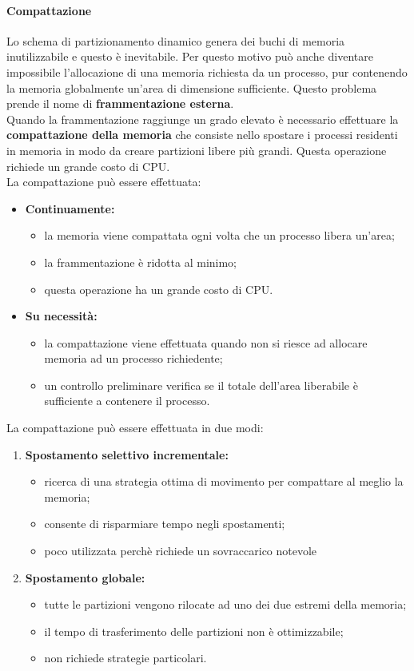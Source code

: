 \documentclass[12pt, letterpaper]{report}
\begin{document}
	\paragraph{Compattazione} Lo schema di partizionamento dinamico genera dei buchi di memoria inutilizzabile e questo è inevitabile. Per questo motivo può anche diventare impossibile l'allocazione di una memoria richiesta da un processo, pur contenendo la memoria globalmente un'area di dimensione sufficiente. Questo problema prende il nome di \textbf{frammentazione esterna}. \\
	Quando la frammentazione raggiunge un grado elevato è necessario effettuare la \textbf{compattazione della memoria} che consiste nello spostare i processi residenti in memoria in modo da creare partizioni libere più grandi. Questa operazione richiede un grande costo di CPU. \\
	La compattazione può essere effettuata:
	\begin{itemize}
		\item \textbf{Continuamente:}
		\begin{itemize}
			\item la memoria viene compattata ogni volta che un processo libera un'area;
			\item la frammentazione è ridotta al minimo;
			\item questa operazione ha un grande costo di CPU.
		\end{itemize}
		\item \textbf{Su necessità:}
		\begin{itemize}
			\item la compattazione viene effettuata quando non si riesce ad allocare memoria ad un processo richiedente;
			\item un controllo preliminare verifica se il totale dell'area liberabile è sufficiente a contenere il processo.
		\end{itemize}
	\end{itemize}
	La compattazione può essere effettuata in due modi:
	\begin{enumerate}
		\item \textbf{Spostamento selettivo incrementale:}
		\begin{itemize}
			\item ricerca di una strategia ottima di movimento per compattare al meglio la memoria;
			\item consente di risparmiare tempo negli spostamenti;
			\item poco utilizzata perchè richiede un sovraccarico notevole
		\end{itemize}
		\item \textbf{Spostamento globale:}
		\begin{itemize}
			\item tutte le partizioni vengono rilocate ad uno dei due estremi della memoria;
			\item il tempo di trasferimento delle partizioni non è ottimizzabile;
			\item non richiede strategie particolari.
		\end{itemize}
	\end{enumerate}
\end{document}
